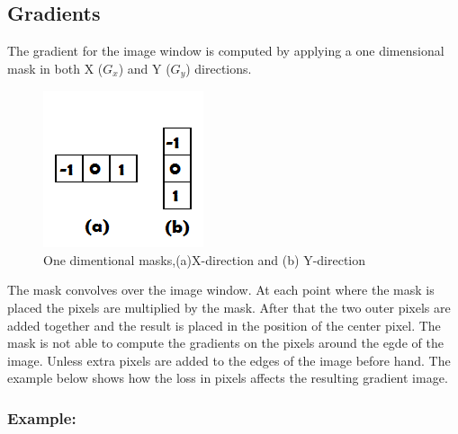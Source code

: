 \subsection{Gradients}
The gradient for the image window is computed by applying a one dimensional mask in both X ($G_x$) and Y ($G_y$) directions.\

\begin{figure}[H]
  \centering
  \includegraphics[scale=0.8]{sobel}
  \caption{One dimentional masks,(a)X-direction and (b) Y-direction}
\end{figure}
\begin{flushleft}
The mask convolves over the image window. At each point where the mask is placed the pixels are multiplied by the mask. After that the two outer pixels are added together and the result is placed in the position of the center pixel. The mask is not able to compute the gradients on the pixels around the egde of the image. Unless extra pixels are added to the edges of the image before hand. The example below shows how the loss in pixels affects the resulting gradient image.
\end{flushleft}
\subsubsection{Example:}

